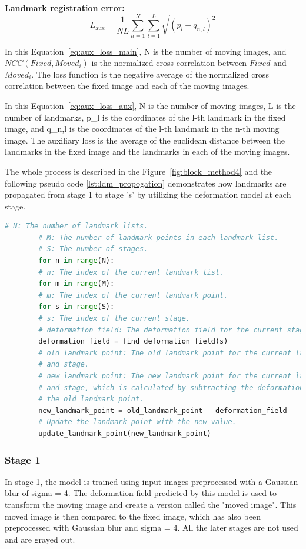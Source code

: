 \documentclass{book}
\begin{document}
	\textbf{Landmark registration error:}
	\begin{equation}\label{eq:aux_loss_aux}
		L_\text{aux} = \frac{1}{NL} \sum_{n=1}^N \sum_{l=1}^L \sqrt{(p_l - q_{n,l})^2}
	\end{equation}
	
	In this Equation~\ref{eq:aux_loss_main}, N is the number of moving images, and $NCC(Fixed, Moved_i)$ is the normalized cross correlation between $Fixed$ and $Moved_i$. The loss function is the negative average of the normalized cross correlation between the fixed image and each of the moving images.
	
	In this Equation~\ref{eq:aux_loss_aux}, N is the number of moving images, L is the number of landmarks, p\_l is the coordinates of the l-th landmark in the fixed image, and q\_{n,l} is the coordinates of the l-th landmark in the n-th moving image. The auxiliary loss is the average of the euclidean distance between the landmarks in the fixed image and the landmarks in each of the moving images.
	
    The whole process is described in the Figure~\ref{fig:block_method4} and the following pseudo code \ref{lst:ldm_propogation} demonstrates how landmarks are propagated from stage 1 to stage 's' by utilizing the deformation model at each stage.
    
    \begin{lstlisting}[language=Python, label=lst:ldm_propogation, caption=Pseudo code to show how the landmarks are propogated from stage to stage.]
    	# N: The number of landmark lists.
    	# M: The number of landmark points in each landmark list.
    	# S: The number of stages.
    	for n in range(N):
    	# n: The index of the current landmark list.
    	for m in range(M):
    	# m: The index of the current landmark point.
    	for s in range(S):
    	# s: The index of the current stage.
    	# deformation_field: The deformation field for the current stage.
    	deformation_field = find_deformation_field(s)
    	# old_landmark_point: The old landmark point for the current landmark point
    	# and stage.
    	# new_landmark_point: The new landmark point for the current landmark point
    	# and stage, which is calculated by subtracting the deformation field from
    	# the old landmark point.
    	new_landmark_point = old_landmark_point - deformation_field
    	# Update the landmark point with the new value.
    	update_landmark_point(new_landmark_point)
    \end{lstlisting}

	\subsubsection{Stage 1}
	In stage 1, the model is trained using input images preprocessed with a Gaussian blur of sigma = 4. The deformation field predicted by this model is used to transform the moving image and create a version called the "moved image". This moved image is then compared to the fixed image, which has also been preprocessed with Gaussian blur and sigma = 4. All the later stages are not used and are grayed out.
\end{document}
